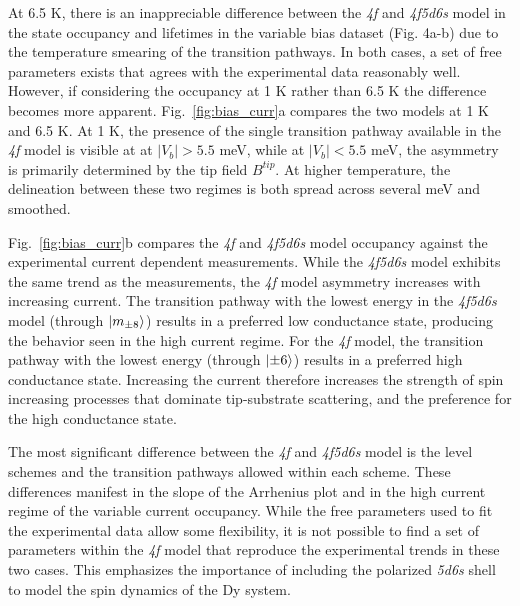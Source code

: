 \documentclass[reprint,amsmath,amssymb,aps,nofootinbib,onecolumn]{revtex4-2}
\begin{document}
At 6.5 K, there is an inappreciable difference between the \textit{4f} and \textit{4f5d6s} model in the state occupancy and lifetimes in the variable bias dataset (Fig. 4a-b) due to the temperature smearing of the transition pathways. In both cases, a set of free parameters exists that agrees with the experimental data reasonably well. However, if considering the occupancy at 1 K rather than 6.5 K the difference becomes more apparent. Fig.~\ref{fig:bias_curr}a compares the two models at 1 K and 6.5 K. At 1 K, the presence of the single transition pathway available in the \textit{4f} model is visible at at $|V_b|>5.5$ meV, while at $|V_b|<5.5$ meV, the asymmetry is primarily determined by the tip field $B^{tip}$. At higher temperature, the delineation between these two regimes is both spread across several meV and smoothed.   

Fig.~\ref{fig:bias_curr}b compares the \textit{4f} and \textit{4f5d6s} model occupancy against the experimental current dependent measurements. While the \textit{4f5d6s} model exhibits the same trend as the measurements, the \textit{4f} model asymmetry increases with increasing current. The transition pathway with the lowest energy in the \textit{4f5d6s} model (through $\ket{m_{\pm 8}}$) results in a preferred low conductance state, producing the behavior seen in the high current regime. For the \textit{4f} model, the transition pathway with the lowest energy (through $\ket{\pm 6}$) results in a preferred high conductance state. Increasing the current therefore increases the strength of spin increasing processes that dominate tip-substrate scattering, and the preference for the high conductance state.  

The most significant difference between the \textit{4f} and \textit{4f5d6s} model is the level schemes and the transition pathways allowed within each scheme. These differences manifest in the slope of the Arrhenius plot and in the high current regime of the variable current occupancy. While the free parameters used to fit the experimental data allow some flexibility, it is not possible to find a set of parameters within the \textit{4f} model that reproduce the experimental trends in these two cases. This emphasizes the importance of including the polarized \textit{5d6s} shell to model the spin dynamics of the Dy system.    




\end{document}
